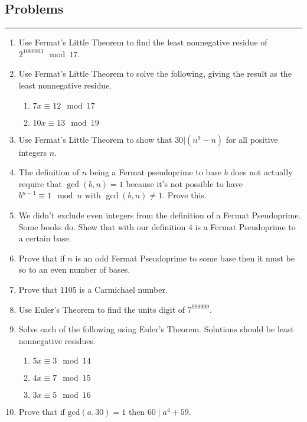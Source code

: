 \documentclass[class=article, crop=false]{standalone}
\begin{document}
\subsection{Problems}
\rule{\textwidth}{1pt}
\begin{enumerate}
\item
  Use Fermat's Little Theorem
  to find the least nonnegative residue of
  $2^{1000003}\mod 17$.

\item
  Use Fermat's Little Theorem to solve the following,
  giving the result as the least nonnegative residue.
  \begin{enumerate}
  \item
	$7x\equiv 12\mod 17$
  \item
	$10x\equiv 13\mod 19$
\end{enumerate}

\item
  Use Fermat's Little Theorem
  to show that
  $30\big|(n^9-n)$
  for all positive integers $n$.

\item
  The definition of $n$ being a Fermat pseudoprime to base $b$
  does not actually require that $\gcd(b,n)=1$
  because it's not possible to have $b^{n-1}\equiv 1\mod n$ with $\gcd(b,n)\neq 1$.
  Prove this.

\item
  We didn't exclude even integers from the definition of a Fermat Pseudoprime.
  Some books do.
  Show that with our definition
  $4$ is a Fermat Pseudoprime to a certain base.

\item
  Prove that if $n$ is an odd Fermat Pseudoprime to some base
  then it must be so to an even number of bases.

\item
  Prove that 1105 is a Carmichael number.

\item
  Use Euler's Theorem to find the units digit of $7^{999999}$.

\item
  Solve each of the following using Euler's Theorem.
  Solutions should be least nonnegative residues.
\begin{enumerate}
\item
  $5x\equiv 3\mod 14$
\item
  $4x\equiv 7\mod 15$
\item
  $3x\equiv 5\mod 16$
\end{enumerate}

\item
  Prove that if $\text{gcd}(a,30)=1$ then $60\mid a^4+59$.


\end{enumerate}
\end{document}
